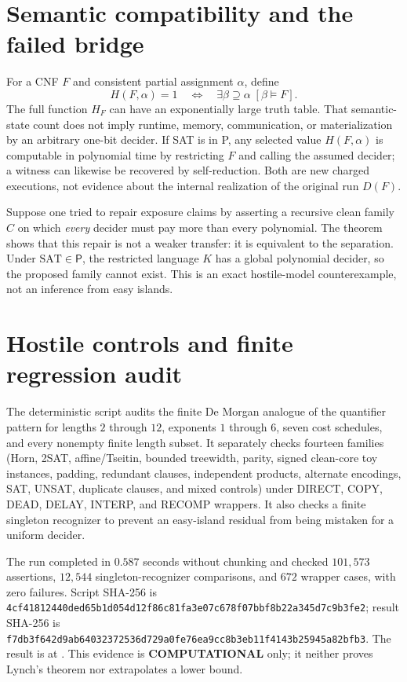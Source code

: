 \documentclass[11pt]{article}
\newcommand{\Pclass}{\mathsf P}
\newcommand{\COMP}{\textbf{COMPUTATIONAL}}
\begin{document}
\section{Semantic compatibility and the failed bridge}
For a CNF \(F\) and consistent partial assignment \(\alpha\), define
\[
 H(F,\alpha)=1\quad\Longleftrightarrow\quad
 \exists\beta\supseteq\alpha\;[\beta\models F].
\]
The full function \(H_F\) can have an exponentially large truth table.  That
semantic-state count does not imply runtime, memory, communication, or
materialization by an arbitrary one-bit decider.  If SAT is in P, any selected
value \(H(F,\alpha)\) is computable in polynomial time by restricting \(F\)
and calling the assumed decider; a witness can likewise be recovered by
self-reduction.  Both are new charged executions, not evidence about the
internal realization of the original run \(D(F)\).

Suppose one tried to repair exposure claims by asserting a recursive clean
family \(C\) on which \emph{every} decider must pay more than every
polynomial.  The theorem shows that this repair is not a weaker transfer:
it is equivalent to the separation.  Under \(\mathrm{SAT}\in\Pclass\), the
restricted language \(K\) has a global polynomial decider, so the proposed
family cannot exist.  This is an exact hostile-model counterexample, not an
inference from easy islands.

\section{Hostile controls and finite regression audit}
The deterministic script
 audits the
finite De Morgan analogue of the quantifier pattern for lengths \(2\) through
\(12\), exponents \(1\) through \(6\), seven cost schedules, and every
nonempty finite length subset.  It separately checks fourteen families
(Horn, 2SAT, affine/Tseitin, bounded treewidth, parity, signed clean-core toy
instances, padding, redundant clauses, independent products, alternate
encodings, SAT, UNSAT, duplicate clauses, and mixed controls) under DIRECT,
COPY, DEAD, DELAY, INTERP, and RECOMP wrappers.  It also checks a finite
singleton recognizer to prevent an easy-island residual from being mistaken
for a uniform decider.

The run completed in \(0.587\) seconds without chunking and checked
\(101{,}573\) assertions, \(12{,}544\) singleton-recognizer comparisons, and
\(672\) wrapper cases, with zero failures.  Script SHA-256 is
\texttt{4cf41812440ded65b1d054d12f86c81fa3e07c678f07bbf8b22a345d7c9b3fe2};
result SHA-256 is
\texttt{f7db3f642d9ab64032372536d729a0fe76ea9cc8b3eb11f4143b25945a82bfb3}.
The result is at
.
This evidence is \COMP{} only; it neither proves Lynch's theorem nor
extrapolates a lower bound.
\end{document}
